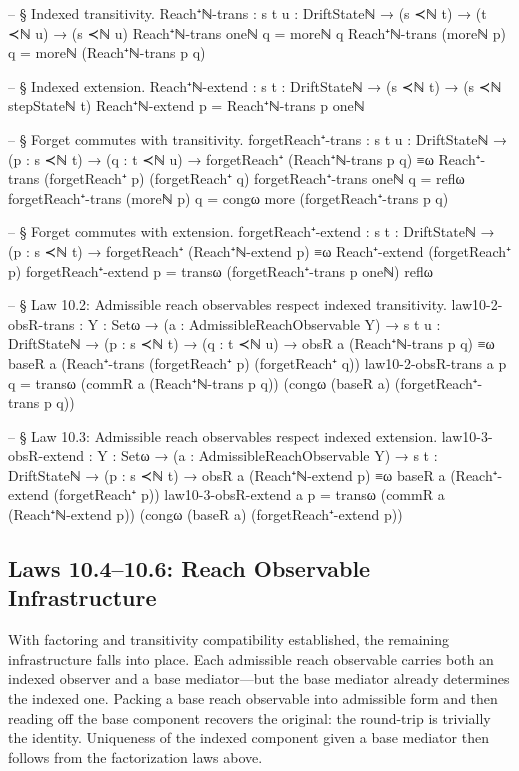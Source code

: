 \documentclass[11pt,a4paper]{book}
\begin{document}
\begin{code}
-- § Indexed transitivity.
Reach⁺ℕ-trans : {s t u : DriftStateℕ} → (s ≺ℕ t) → (t ≺ℕ u) → (s ≺ℕ u)
Reach⁺ℕ-trans oneℕ      q = moreℕ q
Reach⁺ℕ-trans (moreℕ p) q = moreℕ (Reach⁺ℕ-trans p q)

-- § Indexed extension.
Reach⁺ℕ-extend : {s t : DriftStateℕ} → (s ≺ℕ t) → (s ≺ℕ stepStateℕ t)
Reach⁺ℕ-extend p = Reach⁺ℕ-trans p oneℕ

-- § Forget commutes with transitivity.
forgetReach⁺-trans :
  {s t u : DriftStateℕ} →
  (p : s ≺ℕ t) → (q : t ≺ℕ u) →
  forgetReach⁺ (Reach⁺ℕ-trans p q) ≡ω Reach⁺-trans (forgetReach⁺ p) (forgetReach⁺ q)
forgetReach⁺-trans oneℕ      q = reflω
forgetReach⁺-trans (moreℕ p) q = congω more (forgetReach⁺-trans p q)

-- § Forget commutes with extension.
forgetReach⁺-extend :
  {s t : DriftStateℕ} →
  (p : s ≺ℕ t) →
  forgetReach⁺ (Reach⁺ℕ-extend p) ≡ω Reach⁺-extend (forgetReach⁺ p)
forgetReach⁺-extend p =
  transω (forgetReach⁺-trans p oneℕ) reflω

-- § Law 10.2: Admissible reach observables respect indexed transitivity.
law10-2-obsR-trans :
  {Y : Setω} →
  (a : AdmissibleReachObservable Y) →
  {s t u : DriftStateℕ} →
  (p : s ≺ℕ t) → (q : t ≺ℕ u) →
  obsR a (Reach⁺ℕ-trans p q) ≡ω baseR a (Reach⁺-trans (forgetReach⁺ p) (forgetReach⁺ q))
law10-2-obsR-trans a p q =
  transω (commR a (Reach⁺ℕ-trans p q)) (congω (baseR a) (forgetReach⁺-trans p q))

-- § Law 10.3: Admissible reach observables respect indexed extension.
law10-3-obsR-extend :
  {Y : Setω} →
  (a : AdmissibleReachObservable Y) →
  {s t : DriftStateℕ} →
  (p : s ≺ℕ t) →
  obsR a (Reach⁺ℕ-extend p) ≡ω baseR a (Reach⁺-extend (forgetReach⁺ p))
law10-3-obsR-extend a p =
  transω (commR a (Reach⁺ℕ-extend p)) (congω (baseR a) (forgetReach⁺-extend p))
\end{code}

\subsection{Laws 10.4--10.6: Reach Observable Infrastructure}

With factoring and transitivity compatibility established, the remaining infrastructure falls into place. Each admissible reach observable carries both an indexed observer and a base mediator---but the base mediator already determines the indexed one. Packing a base reach observable into admissible form and then reading off the base component recovers the original: the round-trip is trivially the identity. Uniqueness of the indexed component given a base mediator then follows from the factorization laws above.
\end{document}

